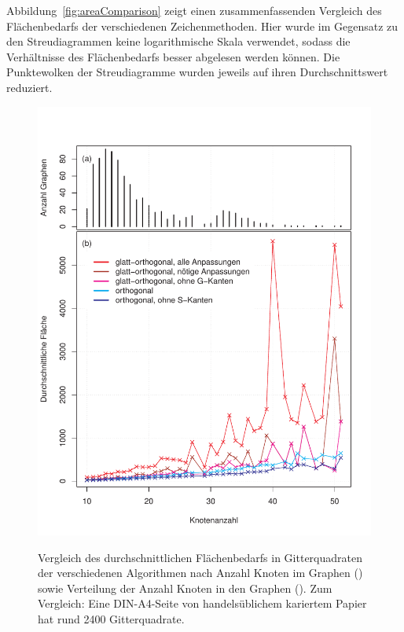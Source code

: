 \documentclass[a4paper]{scrreprt}
\theoremstyle{definition}
\begin{document}
Abbildung~\ref{fig:areaComparison} zeigt einen zusammenfassenden Vergleich des Flächenbedarfs der verschiedenen Zeichenmethoden. Hier wurde im Gegensatz zu den Streudiagrammen keine logarithmische Skala verwendet, sodass die Verhältnisse des Flächenbedarfs besser abgelesen werden können. Die Punktewolken der Streudiagramme wurden jeweils auf ihren Durchschnittswert reduziert.






\begin{figure}[h]
  \centering
  {\includegraphics[width=\textwidth]{plots/area_comparison} \label{fig:graphSizes} \label{fig:areaComparison}}
  \caption{Vergleich des durchschnittlichen Flächenbedarfs in Gitterquadraten der verschiedenen Algorithmen nach Anzahl Knoten im Graphen () sowie  Verteilung der Anzahl Knoten in den Graphen (). Zum Vergleich: Eine DIN-A4-Seite von handelsüblichem kariertem Papier hat rund 2400 Gitterquadrate.}
  \label{fig:areaComparisonAndGraphSizes}
\end{figure}
\end{document}
